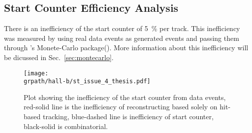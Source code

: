 \FloatBarrier
\subsection{Start Counter Efficiency Analysis}\label{sec:clas.st.eff}
There is an inefficiency of the start counter of 5~\% per track. This inefficiency was measured by using real data events as generated events and passing them through 's Monete-Carlo package(\label{abbr:gsim}). More information about this inefficiency will be dicussed in Sec.~\ref{sec:montecarlo}.




\begin{figure}[h!]\begin{center}
\texttt{[image: \\grpath/hall-b/st\_issue\_4\_thesis.pdf]}
\caption[Start Counter Inefficiency]{\label{fig:classt.ineff}{}Plot showing the inefficiency of the start counter from data events, red-solid line is the inefficiency of reconstructing based solely on hit-based tracking, blue-dashed line is inefficiency of start counter, black-solid is combinatorial. }
\end{center}\end{figure}

